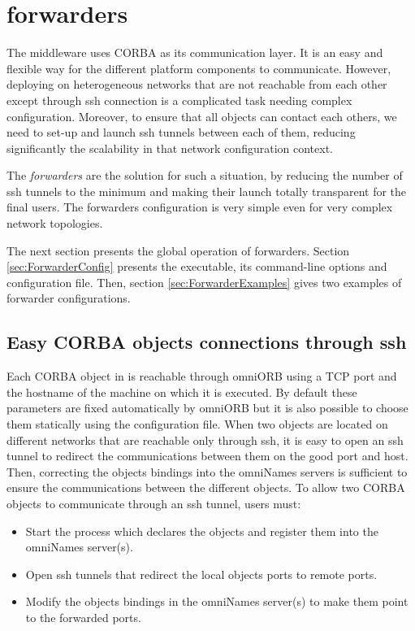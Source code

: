 
\chapter{\diet forwarders}
\label{ch:forwarders}
The \diet middleware uses CORBA as its communication layer. It is an easy
and flexible way for the different platform components to communicate.
However, deploying \diet on heterogeneous networks that are not
reachable from each other except through ssh connection is a complicated
task needing complex configuration. Moreover, to ensure that all
objects can contact each others, we need to set-up and launch ssh
tunnels between each of them, reducing significantly the \diet
scalability in that network configuration context.

The \textit{\diet forwarders} are the solution for such a situation, by
reducing the number of ssh tunnels to the minimum and making their
launch totally transparent for the final users. The \diet forwarders
configuration is very simple even for very complex network topologies.

The next section presents the global operation of \diet
forwarders. Section \ref{sec:ForwarderConfig} presents the \dietforwarder
executable, its command-line options and configuration file. Then,
section \ref{sec:ForwarderExamples} gives two examples of forwarder
configurations.

\section{Easy CORBA objects connections through ssh}
Each CORBA object in \diet is reachable through omniORB using a TCP
port and the hostname of the machine on which it is executed. By
default these parameters are fixed automatically by omniORB but it is
also possible to choose them statically using the \diet configuration
file.
When two objects are located on different networks that are reachable
only through ssh, it is easy to open an ssh tunnel to redirect the
communications between them on the good port and host. Then, correcting
the objects bindings into the omniNames servers is sufficient to ensure
the communications between the different objects. To allow two
CORBA objects to communicate through an ssh tunnel, users must:
\begin{itemize}
\item Start the process which declares the objects and register them
  into the omniNames server(s).
\item Open ssh tunnels that redirect the local objects ports to
  remote ports.
\item Modify the objects bindings in the omniNames server(s) to make
  them point to the forwarded ports.
\end{itemize}

